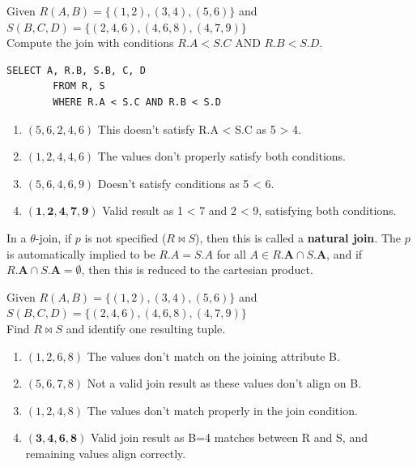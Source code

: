     \begin{example}
      Given $R(A,B) = \{(1,2), (3,4), (5,6)\}$ and\\
      $S(B,C,D) = \{(2,4,6), (4,6,8), (4,7,9)\}$\\
      Compute the join with conditions $R.A < S.C$ AND $R.B < S.D$.

      \begin{lstlisting}[basicstyle=\ttfamily]
        SELECT A, R.B, S.B, C, D
        FROM R, S
        WHERE R.A < S.C AND R.B < S.D
      \end{lstlisting}

      \begin{enumerate}
        \item $(5,6,2,4,6)$ This doesn't satisfy R.A < S.C as 5 > 4.
        
        \item $(1,2,4,4,6)$ The values don't properly satisfy both conditions.
        
        \item $(5,6,4,6,9)$ Doesn't satisfy conditions as 5 < 6.
        
        \item $\mathbf{(1,2,4,7,9)}$ Valid result as 1 < 7 and 2 < 9, satisfying both conditions.
      \end{enumerate}
    \end{example}

    \begin{definition}
      In a $\theta$-join, if $p$ is not specified ($R \bowtie S$), then this is called a \textbf{natural join}. The $p$ is automatically implied to be $R.A = S.A$ for all $A \in R.\mathbf{A} \cap S.\mathbf{A}$, and if $R.\mathbf{A} \cap S.\mathbf{A} = \emptyset$, then this is reduced to the cartesian product. 
    \end{definition}

    \begin{example}
      Given $R(A,B) = \{(1,2), (3,4), (5,6)\}$ and\\
      $S(B,C,D) = \{(2,4,6), (4,6,8), (4,7,9)\}$\\
      Find $R \bowtie S$ and identify one resulting tuple.

      \begin{enumerate}
        \item $(1,2,6,8)$ The values don't match on the joining attribute B.
        
        \item $(5,6,7,8)$ Not a valid join result as these values don't align on B.
        
        \item $(1,2,4,8)$ The values don't match properly in the join condition.
        
        \item $\mathbf{(3,4,6,8)}$ Valid join result as B=4 matches between R and S, and remaining values align correctly.
      \end{enumerate}
    \end{example}

